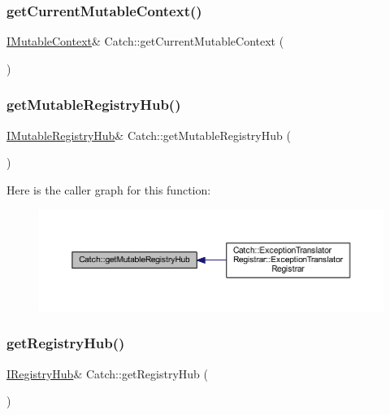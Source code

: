 \subsubsection{\texorpdfstring{get\+Current\+Mutable\+Context()}{getCurrentMutableContext()}}
{\footnotesize\ttfamily \hyperlink{struct_catch_1_1_i_mutable_context}{I\+Mutable\+Context}\& Catch\+::get\+Current\+Mutable\+Context (\begin{DoxyParamCaption}{ }\end{DoxyParamCaption})}

\hypertarget{namespace_catch_ac9ddcc6d66079add9cb2a3140b8ae51e}{}\label{namespace_catch_ac9ddcc6d66079add9cb2a3140b8ae51e} 
\subsubsection{\texorpdfstring{get\+Mutable\+Registry\+Hub()}{getMutableRegistryHub()}}
{\footnotesize\ttfamily \hyperlink{struct_catch_1_1_i_mutable_registry_hub}{I\+Mutable\+Registry\+Hub}\& Catch\+::get\+Mutable\+Registry\+Hub (\begin{DoxyParamCaption}{ }\end{DoxyParamCaption})}

Here is the caller graph for this function\+:\nopagebreak
\begin{figure}[H]
\begin{center}
\leavevmode
\includegraphics[width=350pt]{namespace_catch_ac9ddcc6d66079add9cb2a3140b8ae51e_icgraph}
\end{center}
\end{figure}
\hypertarget{namespace_catch_ac24b072979540bfd922e7d46e899f46f}{}\label{namespace_catch_ac24b072979540bfd922e7d46e899f46f} 
\subsubsection{\texorpdfstring{get\+Registry\+Hub()}{getRegistryHub()}}
{\footnotesize\ttfamily \hyperlink{struct_catch_1_1_i_registry_hub}{I\+Registry\+Hub}\& Catch\+::get\+Registry\+Hub (\begin{DoxyParamCaption}{ }\end{DoxyParamCaption})}

